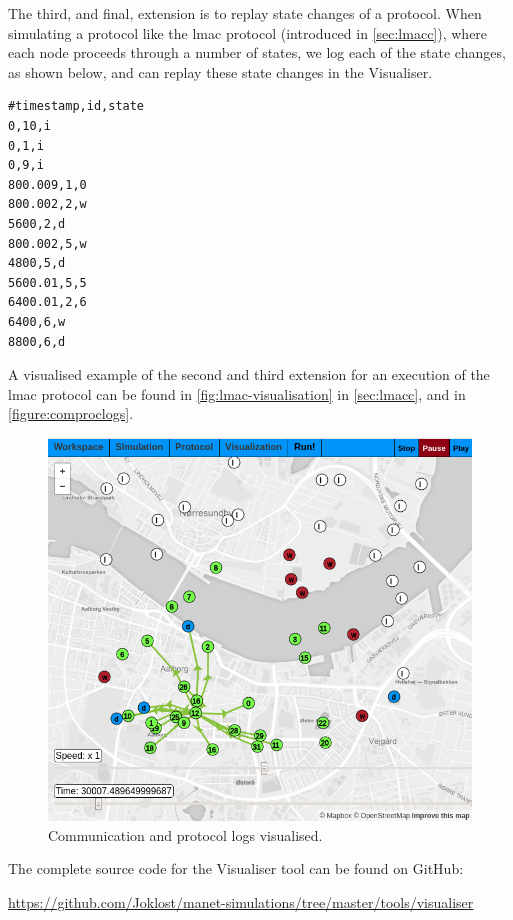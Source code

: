 The third, and final, extension is to replay state changes of a protocol. When simulating a protocol like the
\gls{lmac} protocol (introduced in \autoref{sec:lmacc}), where each node proceeds through a number of states,
we log each of the state changes, as shown below, and can replay these state changes in the Visualiser.
%
\begin{verbatim}
#timestamp,id,state
0,10,i
0,1,i
0,9,i
800.009,1,0
800.002,2,w
5600,2,d
800.002,5,w
4800,5,d
5600.01,5,5
6400.01,2,6
6400,6,w
8800,6,d
\end{verbatim}

A visualised example of the second and third extension for an execution of the \gls{lmac} protocol can be
found in \autoref{fig:lmac-visualisation} in \autoref{sec:lmacc}, and in \autoref{figure:comproclogs}.

\begin{figure}[H]
    \centering
    \includegraphics[width=.8\textwidth]{figures/visualiser/frontpage-visualisation.png}
    \caption{Communication and protocol logs visualised.}
    \label{figure:comproclogs}
\end{figure}


The complete source code for the Visualiser tool can be found on GitHub:

{\small \url{https://github.com/Joklost/manet-simulations/tree/master/tools/visualiser}}
%